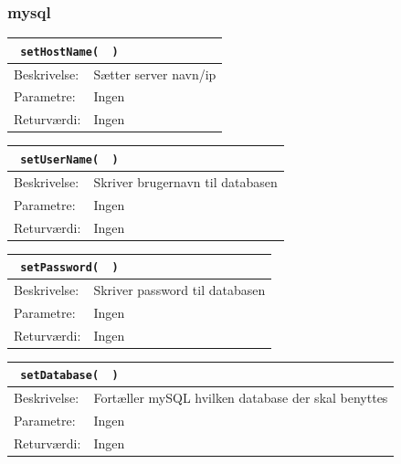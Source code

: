 \subsubsection{mysql}
\begin{table}[H]
\begin{tabular}{l p{12.5cm}}
\multicolumn{2}{l}{\texttt{\textcolor{blue}{} setHostName( \textcolor{blue}{} )}} \\
\hline
Beskrivelse: & Sætter server navn/ip\\
Parametre: & Ingen\\
Returværdi: & Ingen\\
\end{tabular}
\end{table}

\begin{table}[H]
\begin{tabular}{l p{12.5cm}}
\multicolumn{2}{l}{\texttt{\textcolor{blue}{} setUserName( \textcolor{blue}{} )}} \\
\hline
Beskrivelse: & Skriver brugernavn til databasen\\
Parametre: & Ingen\\
Returværdi: & Ingen\\
\end{tabular}
\end{table}

\begin{table}[H]
\begin{tabular}{l p{12.5cm}}
\multicolumn{2}{l}{\texttt{\textcolor{blue}{} setPassword( \textcolor{blue}{} )}} \\
\hline
Beskrivelse:&Skriver password til databasen\\
Parametre: & Ingen\\
Returværdi: & Ingen\\
\end{tabular}
\end{table}

\begin{table}[H]
\begin{tabular}{l p{12.5cm}}
\multicolumn{2}{l}{\texttt{\textcolor{blue}{} setDatabase( \textcolor{blue}{} )}} \\
\hline
Beskrivelse: & Fortæller mySQL hvilken database der skal benyttes\\
Parametre: & Ingen\\
Returværdi: & Ingen\\
\end{tabular}
\end{table}

